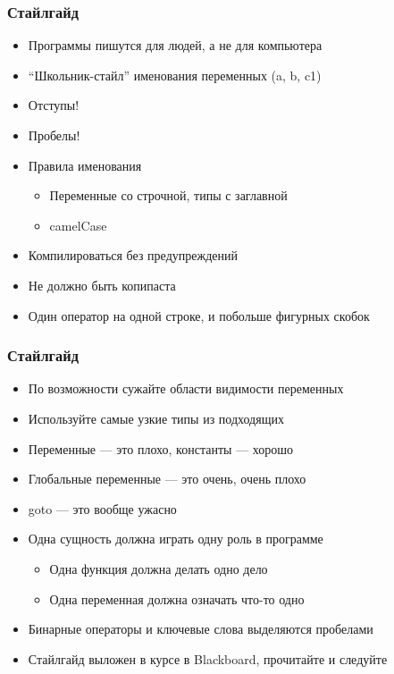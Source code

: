 \documentclass{../../slides-style}
\begin{document}
    
    \begin{frame}[plain]
        \titlepage
    \end{frame}
    
    \begin{frame}
        \frametitle{Стайлгайд}
        \begin{itemize}
            \item Программы пишутся для людей, а не для компьютера
            \item \enquote{Школьник-стайл} именования переменных (a, b, c1)
            \item Отступы!
            \item Пробелы!
            \item Правила именования
            \begin{itemize}
                \item Переменные со строчной, типы с заглавной
                \item camelCase
            \end{itemize}
            \item Компилироваться без предупреждений
            \item Не должно быть копипаста
            \item Один оператор на одной строке, и побольше фигурных скобок
        \end{itemize}
    \end{frame}

    \begin{frame}
        \frametitle{Стайлгайд}
        \begin{itemize}
            \item По возможности сужайте области видимости переменных
            \item Используйте самые узкие типы из подходящих
            \item Переменные --- это плохо, константы --- хорошо
            \item Глобальные переменные --- это очень, очень плохо
            \item goto --- это вообще ужасно
            \item Одна сущность должна играть одну роль в программе
            \begin{itemize}
                \item Одна функция должна делать одно дело
                \item Одна переменная должна означать что-то одно
            \end{itemize}
            \item Бинарные операторы и ключевые слова выделяются пробелами
            \item Стайлгайд выложен в курсе в Blackboard, прочитайте и следуйте
        \end{itemize}
    \end{frame}
\end{document}
